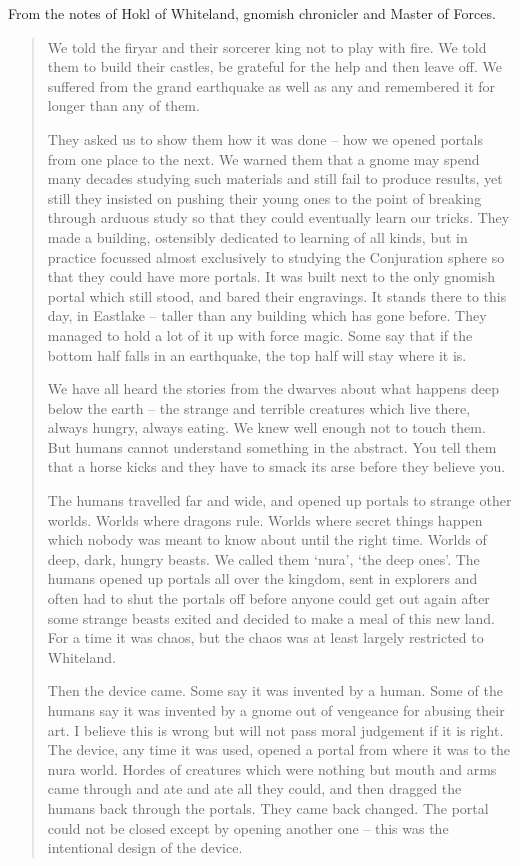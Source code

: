 \begin{multicols}{2}
\label{r_hunter}

From the notes of Hokl of Whiteland, gnomish chronicler and Master of Forces.

\begin{quotation}

	We told the firyar and their sorcerer king not to play with fire.
	We told them to build their castles, be grateful for the help and then leave off.
	We suffered from the grand earthquake as well as any and remembered it for longer than any of them.  

	They asked us to show them how it was done -- how we opened portals from one place to the next.
	We warned them that a gnome may spend many decades studying such materials and still fail to produce results, yet still they insisted on pushing their young ones to the point of breaking through arduous study so that they could eventually learn our tricks.
	They made a building, ostensibly dedicated to learning of all kinds, but in practice focussed almost exclusively to studying the Conjuration sphere so that they could have more portals.
	It was built next to the only gnomish portal which still stood, and bared their engravings.
	It stands there to this day, in Eastlake -- taller than any building which has gone before.
	They managed to hold a lot of it up with force magic.
	Some say that if the bottom half falls in an earthquake, the top half will stay where it is.

	We have all heard the stories from the dwarves about what happens deep below the earth -- the strange and terrible creatures which live there, always hungry, always eating.
	We knew well enough not to touch them.
	But humans cannot understand something in the abstract.
	You tell them that a horse kicks and they have to smack its arse before they believe you.

	The humans travelled far and wide, and opened up portals to strange other worlds.
	Worlds where dragons rule.
	Worlds where secret things happen which nobody was meant to know about until the right time.
	Worlds of deep, dark, hungry beasts.
	We called them `nura', `the deep ones'.
	The humans opened up portals all over the kingdom, sent in explorers and often had to shut the portals off before anyone could get out again after some strange beasts exited and decided to make a meal of this new land.
	For a time it was chaos, but the chaos was at least largely restricted to Whiteland.

	Then the device came.
	Some say it was invented by a human.
	Some of the humans say it was invented by a gnome out of vengeance for abusing their art.
	I believe this is wrong but will not pass moral judgement if it is right.
	The device, any time it was used, opened a portal from where it was to the nura world.
	Hordes of creatures which were nothing but mouth and arms came through and ate and ate all they could, and then dragged the humans back through the portals.
	They came back changed.
	The portal could not be closed except by opening another one -- this was the intentional design of the device.


\end{quotation}
\end{multicols}

